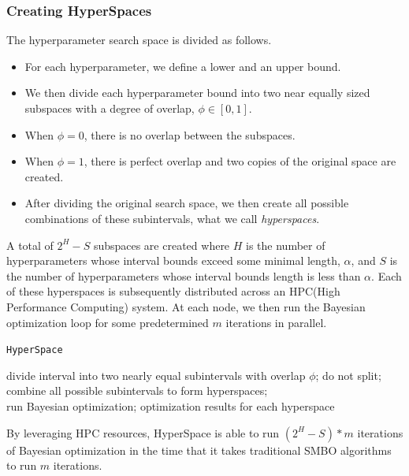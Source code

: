 \subsubsection{Creating HyperSpaces}
The hyperparameter search space is divided as follows.
\begin{itemize}
	\item For each hyperparameter, we define a lower and an upper bound.
	\item We then divide each hyperparameter bound into two near equally sized subspaces with a degree of overlap, $ \phi \in [0,1] $.
	\item When $\phi=0$, there is no overlap between the subspaces.
	\item When $\phi=1$, there is perfect overlap and two copies of the original space are created.
	\item After dividing the original search space, we then create all possible combinations of these subintervals, what we call \textit{hyperspaces}.
\end{itemize}
A total of $2^H-S$ subspaces are created where $H$ is the number of hyperparameters whose interval bounds exceed some minimal length, $\alpha$, and $S$ is the number of hyperparameters whose interval bounds length is less than $\alpha$.
Each of these hyperspaces is subsequently distributed across an HPC(High Performance Computing) system.
At each node, we then run the Bayesian optimization loop for some predetermined $m$ iterations in parallel.\\

\begin{algorithm}[H] 
	\caption{\texttt{HyperSpace}}
	{
		{
			divide interval into two nearly equal subintervals with overlap $\phi$;
		}
		{
			do not split;
		}
	}
	combine all possible subintervals to form hyperspaces;\\
	{
		run Bayesian optimization;
	}
	\Return optimization results for each hyperspace
\end{algorithm}
\vspace{2em}
By leveraging HPC resources, HyperSpace is able to run $(2^H-S) * m$ iterations of Bayesian optimization in the time that it takes traditional SMBO algorithms to run $m$ iterations.


